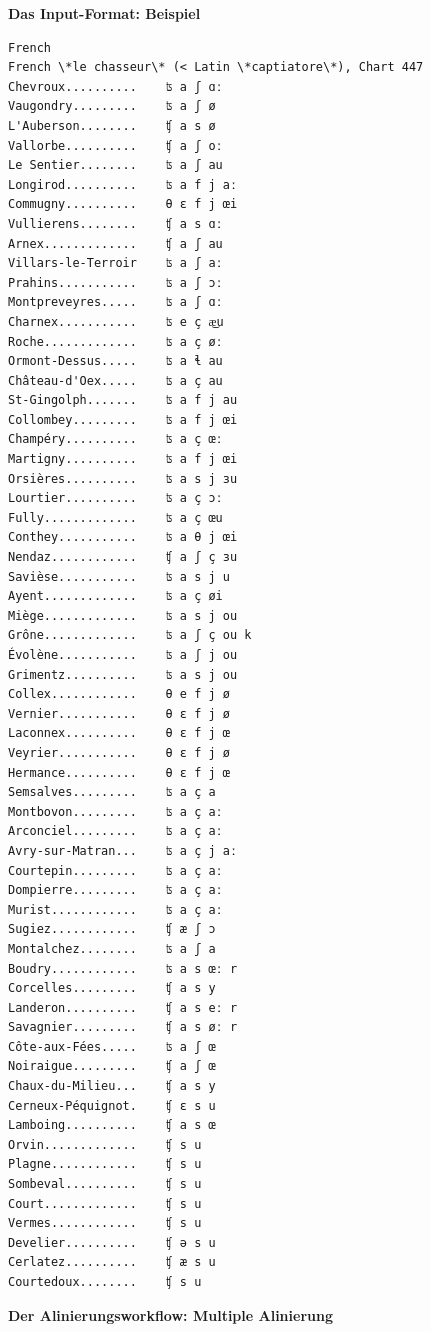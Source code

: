 \par\noindent\textbf{Das Input-Format: Beispiel}

\begin{verbatim}
French
French \*le chasseur\* (< Latin \*captiatore\*), Chart 447
Chevroux..........    ʦ a ʃ ɑː
Vaugondry.........    ʦ a ʃ ø
L'Auberson........    ʧ a s ø
Vallorbe..........    ʧ a ʃ oː
Le Sentier........    ʦ a ʃ au
Longirod..........    ʦ a f j aː
Commugny..........    θ ɛ f j œi
Vullierens........    ʧ a s ɑː
Arnex.............    ʧ a ʃ au
Villars-le-Terroir    ʦ a ʃ aː
Prahins...........    ʦ a ʃ ɔː
Montpreveyres.....    ʦ a ʃ ɑː
Charnex...........    ʦ e ç æ͜u
Roche.............    ʦ a ç øː
Ormont-Dessus.....    ʦ a ɬ au
Château-d'Oex.....    ʦ a ç au
St-Gingolph.......    ʦ a f j au
Collombey.........    ʦ a f j œi
Champéry..........    ʦ a ç œː
Martigny..........    ʦ a f j œi
Orsières..........    ʦ a s j ɜu
Lourtier..........    ʦ a ç ɔː
Fully.............    ʦ a ç œu
Conthey...........    ʦ a θ j œi
Nendaz............    ʧ a ʃ ç ɜu
Savièse...........    ʦ a s j u
Ayent.............    ʦ a ç øi
Miège.............    ʦ a s j ou
Grône.............    ʦ a ʃ ç ou k
Évolène...........    ʦ a ʃ j ou
Grimentz..........    ʦ a s j ou
Collex............    θ e f j ø
Vernier...........    θ ɛ f j ø
Laconnex..........    θ ɛ f j œ
Veyrier...........    θ ɛ f j ø
Hermance..........    θ ɛ f j œ
Semsalves.........    ʦ a ç a
Montbovon.........    ʦ a ç aː
Arconciel.........    ʦ a ç aː
Avry-sur-Matran...    ʦ a ç j aː
Courtepin.........    ʦ a ç aː
Dompierre.........    ʦ a ç aː
Murist............    ʦ a ç aː
Sugiez............    ʧ æ ʃ ɔ
Montalchez........    ʦ a ʃ a
Boudry............    ʦ a s œː r
Corcelles.........    ʧ a s y
Landeron..........    ʧ a s eː r
Savagnier.........    ʧ a s øː r
Côte-aux-Fées.....    ʦ a ʃ œ
Noiraigue.........    ʧ a ʃ œ
Chaux-du-Milieu...    ʧ a s y
Cerneux-Péquignot.    ʧ ɛ s u
Lamboing..........    ʧ a s œ
Orvin.............    ʧ s u
Plagne............    ʧ s u
Sombeval..........    ʧ s u
Court.............    ʧ s u
Vermes............    ʧ s u
Develier..........    ʧ ə s u
Cerlatez..........    ʧ æ s u
Courtedoux........    ʧ s u
\end{verbatim}



\par\noindent\textbf{Der Alinierungsworkflow: Multiple Alinierung}

